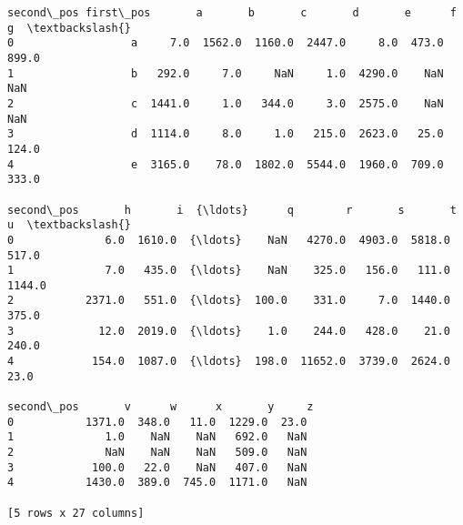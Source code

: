 \documentclass[11pt]{article}
\makeatletter
\newcommand{\boxspacing}{\kern\kvtcb@left@rule\kern\kvtcb@boxsep}
\newcommand{\prompt}[4]{
        \ttfamily\llap{{\color{#2}[#3]:\hspace{3pt}#4}}\vspace{-\baselineskip}
    }
\makeatother
\begin{document}
            \begin{tcolorbox}[breakable, size=fbox, boxrule=.5pt, pad at break*=1mm, opacityfill=0]
\prompt{Out}{outcolor}{10}{\boxspacing}
\begin{Verbatim}[commandchars=\\\{\}]
second\_pos first\_pos       a       b       c       d       e      f      g  \textbackslash{}
0                  a     7.0  1562.0  1160.0  2447.0     8.0  473.0  899.0
1                  b   292.0     7.0     NaN     1.0  4290.0    NaN    NaN
2                  c  1441.0     1.0   344.0     3.0  2575.0    NaN    NaN
3                  d  1114.0     8.0     1.0   215.0  2623.0   25.0  124.0
4                  e  3165.0    78.0  1802.0  5544.0  1960.0  709.0  333.0

second\_pos       h       i  {\ldots}      q        r       s       t       u  \textbackslash{}
0              6.0  1610.0  {\ldots}    NaN   4270.0  4903.0  5818.0   517.0
1              7.0   435.0  {\ldots}    NaN    325.0   156.0   111.0  1144.0
2           2371.0   551.0  {\ldots}  100.0    331.0     7.0  1440.0   375.0
3             12.0  2019.0  {\ldots}    1.0    244.0   428.0    21.0   240.0
4            154.0  1087.0  {\ldots}  198.0  11652.0  3739.0  2624.0    23.0

second\_pos       v      w      x       y     z
0           1371.0  348.0   11.0  1229.0  23.0
1              1.0    NaN    NaN   692.0   NaN
2              NaN    NaN    NaN   509.0   NaN
3            100.0   22.0    NaN   407.0   NaN
4           1430.0  389.0  745.0  1171.0   NaN

[5 rows x 27 columns]
\end{Verbatim}
\end{tcolorbox}
        
\end{document}
